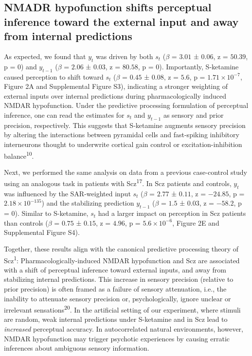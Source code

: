 \documentclass[
]{article}
\begin{document}
\subsection{NMADR hypofunction shifts perceptual inference toward the
external input and away from internal
predictions}\label{nmadr-hypofunction-shifts-perceptual-inference-toward-the-external-input-and-away-from-internal-predictions}

As expected, we found that \(y_t\) was driven by both \(s_t\) (\(\beta\)
= \(3.01\) ± \(0.06\), z = \(50.39\), p = \(0\)) and \(y_{t-1}\)
(\(\beta\) = \(2.06\) ± \(0.03\), z = \(80.58\), p = \(0\)).
Importantly, S-ketamine caused perception to shift toward \(s_t\)
(\(\beta\) = \(0.45\) ± \(0.08\), z = \(5.6\), p =
\(\ensuremath{1.71\times 10^{-7}}\), Figure 2A and Supplemental Figure
S3), indicating a stronger weighting of external inputs over internal
predictions during pharmacologically induced NMDAR hypofunction. Under
the predictive processing formulation of perceptual inference, one can
read the estimates for \(s_t\) and \(y_{t-1}\) as sensory and prior
precision, respectively. This suggests that S-ketamine augments sensory
precision by altering the interactions between pyramidal cells and
fast-spiking inhibitory interneurons thought to underwrite cortical gain
control or excitation-inhibition balance\textsuperscript{10}.

Next, we performed the same analysis on data from a previous
case-control study using an analogous task in patients with
Scz\textsuperscript{17}. In Scz patients and controls, \(y_t\) was
influenced by the SAR-weighted input \(s_t\) (\(\beta\) = \(2.77\) ±
\(0.11\), z = \(-24.85\), p = \(\ensuremath{2.18\times 10^{-135}}\)) and
the stabilizing prediction \(y_{t-1}\) (\(\beta\) = \(1.5\) ± \(0.03\),
z = \(-58.2\), p = \(0\)). Similar to S-ketamine, \(s_t\) had a larger
impact on perception in Scz patients than controls (\(\beta\) = \(0.75\)
± \(0.15\), z = \(4.96\), p = \(\ensuremath{5.6\times 10^{-6}}\), Figure
2E and Supplemental Figure S4).

Together, these results align with the canonical predictive processing
theory of Scz\textsuperscript{1}: Pharmacologically-induced NMDAR
hypofunction and Scz are associated with a shift of perceptual inference
toward external inputs, and away from stabilizing internal predictions.
This increase in sensory precision (relative to prior precision) is
often framed as a failure of sensory attenuation, i.e., the inability to
attenuate sensory precision or, psychologically, ignore unclear or
irrelevant sensations\textsuperscript{20}. In the artificial setting of
our experiment, where stimuli are random, weak internal predictions
under S-ketamine and in Scz lead to \emph{increased} perceptual
accuracy. In autocorrelated natural environments, however, NMDAR
hypofunction may trigger psychotic experiences by causing erratic
inferences about ambiguous sensory information.
\end{document}
